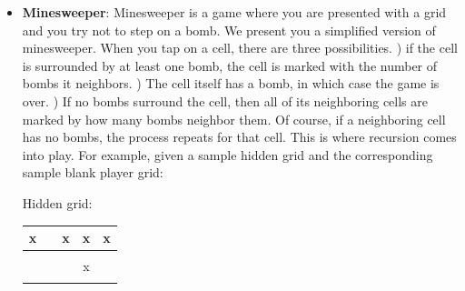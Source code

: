 \documentclass{article}
\begin{document}
\begin{enumerate}[label=(\alph*)]
\begin{itemize}
\begin{lstlisting}[style=CStyle]
    int main() {
      answer = num_paths(example_grid, 0, 0 );
      printf("Num paths = %d", answer );
      return 0;
    }
    
    int num_paths(int array[], int x, int y) {
      
      int paths = 0;
      // Reached destination
      if (x == N-1 && y == N-1) {
        return 1;
      }
      // Out of bounds
      if (x >= N || y >= N) {
        return 0;
      }
      // Obstacle
      if (array[x * N + y] == 1) {
        return 0;
      }
      
      // Recursive Cases
      paths += num_paths(array, x, y+1);
      paths += num_paths(array, x+1, y);
    
      return paths;
    } \end{lstlisting}

    \item  \textbf{Minesweeper}: Minesweeper is a game where you are presented with a grid and you try not to step on a bomb. We present you a simplified version of minesweeper. When you tap on a cell, there are three possibilities. \newline {}) if the cell is surrounded by at least one bomb, the cell is marked with the number of bombs it neighbors. ) The cell itself has a bomb, in which case the game is over. ) If no bombs surround the cell, then all of its neighboring cells are marked by how many bombs neighbor them. Of course, if a neighboring cell has no bombs, the process repeats for that cell. This is where recursion comes into play. For example, given a sample hidden grid and the corresponding sample blank player grid: 
    \newline
    
    
   
    
     \begin{center}
      Hidden grid: \newline
    \begin{tabular}{ | c | c | c | c | c |}
    \hline
      x &  & x & x & x \\
      \hline
       &  &  &  &  \\
      \hline
       &  &  & x &  \\
      \hline
       &  &  &  &  \\
      \hline
    \end{tabular}
    \end{center}


\end{itemize}
\end{enumerate}
\end{document}
